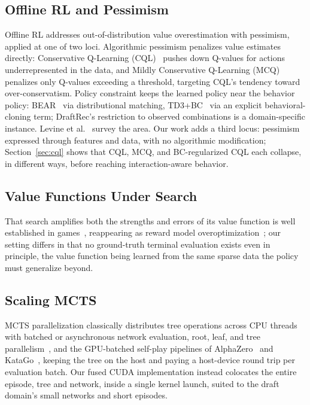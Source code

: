 \documentclass[journal]{IEEEtran}
\begin{document}
\subsection{Offline RL and Pessimism}

Offline RL addresses out-of-distribution value overestimation with pessimism, applied at one of two loci. Algorithmic pessimism penalizes value estimates directly: Conservative Q-Learning (CQL)~\cite{kumar2020conservative} pushes down Q-values for actions underrepresented in the data, and Mildly Conservative Q-Learning (MCQ)~\cite{lyu2022mildly} penalizes only Q-values exceeding a threshold, targeting CQL's tendency toward over-conservatism. Policy constraint keeps the learned policy near the behavior policy: BEAR~\cite{kumar2019stabilizing} via distributional matching, TD3+BC~\cite{fujimoto2021minimalist} via an explicit behavioral-cloning term; DraftRec's restriction to observed combinations is a domain-specific instance. Levine et al.~\cite{levine2020offline} survey the area. Our work adds a third locus: pessimism expressed through features and data, with no algorithmic modification; Section~\ref{sec:cql} shows that CQL, MCQ, and BC-regularized CQL each collapse, in different ways, before reaching interaction-aware behavior.

\subsection{Value Functions Under Search}

That search amplifies both the strengths and errors of its value function is well established in games~\cite{silver2016mastering,silver2018general}, reappearing as reward model overoptimization~\cite{gao2023scaling}; our setting differs in that no ground-truth terminal evaluation exists even in principle, the value function being learned from the same sparse data the policy must generalize beyond.

\subsection{Scaling MCTS}

MCTS parallelization classically distributes tree operations across CPU threads with batched or asynchronous network evaluation, root, leaf, and tree parallelism~\cite{chaslot2008parallel}, and the GPU-batched self-play pipelines of AlphaZero~\cite{silver2018general} and KataGo~\cite{wu2019accelerating}, keeping the tree on the host and paying a host-device round trip per evaluation batch. Our fused CUDA implementation instead colocates the entire episode, tree and network, inside a single kernel launch, suited to the draft domain's small networks and short episodes.
\end{document}
